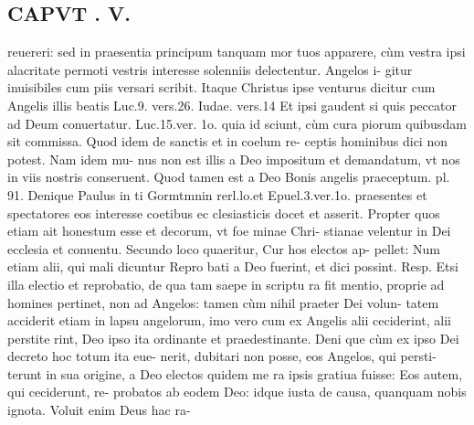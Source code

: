 \documentclass{article}
\begin{document}
\begin{pages}
\section*{CAPVT . V. }
\marginpar{[ p.333 ]}\pstart reuereri: sed in praesentia principum tanquam mor tuos apparere, cùm vestra ipsi alacritate permoti vestris interesse solenniis delectentur. Angelos i- gitur inuisibiles cum piis versari scribit. Itaque Christus ipse venturus dicitur cum Angelis illis beatis Luc.9. vers.26. Iudae. vers.14 Et ipsi gaudent si quis peccator ad Deum conuertatur. Luc.15.ver. 1o. quia id sciunt, cùm cura piorum quibusdam sit commissa. Quod idem de sanctis et in coelum re- ceptis hominibus dici non potest. Nam idem mu- nus non est illis a Deo impositum et demandatum, vt nos in viis nostris conseruent. Quod tamen est a Deo Bonis angelis praeceptum. pl. 91. Denique Paulus in ti Gormtmnin rerl.lo.et Epuel.3.ver.1o. praesentes et spectatores eos interesse coetibus ec clesiasticis docet et asserit. Propter quos etiam ait honestum esse et decorum, vt foe minae Chri- stianae velentur in Dei ecclesia et conuentu.  \pend\pstart Secundo loco quaeritur, Cur hos electos ap- pellet: Num etiam alii, qui mali dicuntur Repro bati a Deo fuerint, et dici possint. Resp. Etsi illa electio et reprobatio, de qua tam saepe in scriptu ra fit mentio, proprie ad homines pertinet, non ad Angelos: tamen cùm nihil praeter Dei volun- tatem acciderit etiam in lapsu angelorum, imo vero cum ex Angelis alii ceciderint, alii perstite rint, Deo ipso ita ordinante et praedestinante. Deni que cùm ex ipso Dei decreto hoc totum ita eue- nerit, dubitari non posse, eos Angelos, qui persti- terunt in sua origine, a Deo electos quidem me ra ipsis gratiua fuisse: Eos autem, qui ceciderunt, re- probatos ab eodem Deo: idque iusta de causa, quanquam nobis ignota. Voluit enim Deus hac ra-  \pend

\end{pages}
\end{document}
